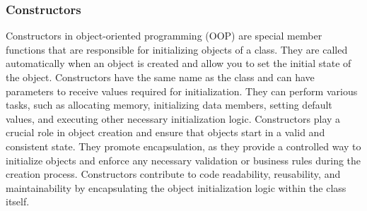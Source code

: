 \subsubsection*{Constructors}

Constructors in object-oriented programming (OOP) are special member functions that are responsible for initializing objects of a class. They are called automatically when an object is created and allow you to set the initial 
state of the object. Constructors have the same name as the class and can have parameters to receive values required for initialization. They can perform various tasks, such as allocating memory, initializing data members, 
setting default values, and executing other necessary initialization logic. Constructors play a crucial role in object creation and ensure that objects start in a valid and consistent state. They promote encapsulation, as 
they provide a controlled way to initialize objects and enforce any necessary validation or business rules during the creation process. Constructors contribute to code readability, reusability, and maintainability by encapsulating 
the object initialization logic within the class itself. \\

